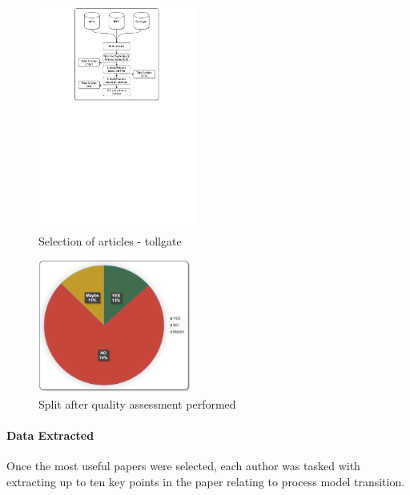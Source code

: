 \documentclass[conference]{IEEEtran}
\begin{document}
\vspace{10mm}
\begin{figure}[h!] 
    \centering
    \includegraphics[trim={4.5cm 17cm 4.5cm 0},clip,width=0.465\textwidth]{images/SLRProcessVertical}
    \caption{Selection of articles - tollgate}
    \label{fig:SLRProcess}
\end{figure}

\begin{figure}[h!]
    \centering
    \includegraphics[width=0.45\textwidth]{images/splitQA.png}
    \caption{Split after quality assessment performed}
    \label{fig:splitQAUpdated}
\end{figure}


\paragraph{Data Extracted}
Once the most useful papers were selected, each author was tasked with extracting up to ten key points in the paper relating to process model transition.  %

\end{document}
